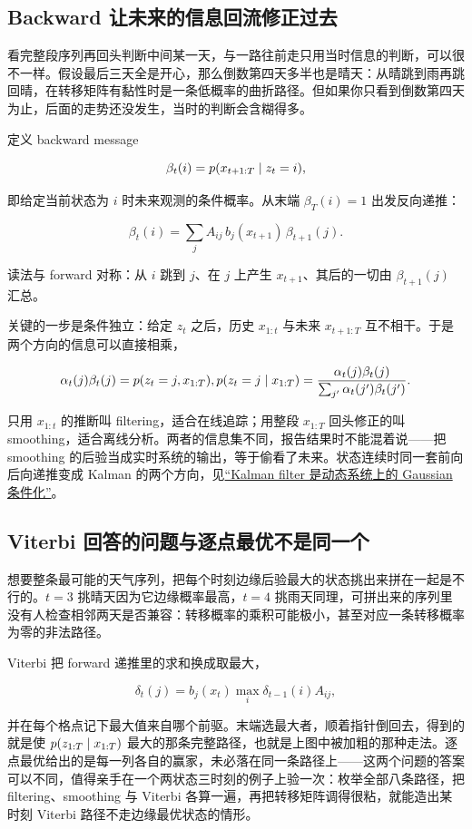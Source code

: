 \subsection{Backward 让未来的信息回流修正过去}

看完整段序列再回头判断中间某一天，与一路往前走只用当时信息的判断，可以很不一样。假设最后三天全是开心，那么倒数第四天多半也是晴天：从晴跳到雨再跳回晴，在转移矩阵有黏性时是一条低概率的曲折路径。但如果你只看到倒数第四天为止，后面的走势还没发生，当时的判断会含糊得多。

定义 backward message

\[
\beta_t(i)=p(x_{t+1:T}\mid z_t=i),
\]

即给定当前状态为 \(i\) 时未来观测的条件概率。从末端 \(\beta_T(i)=1\) 出发反向递推：

\[
\beta_t(i)=\sum_jA_{ij}\,b_j(x_{t+1})\,\beta_{t+1}(j).
\]

读法与 forward 对称：从 \(i\) 跳到 \(j\)、在 \(j\) 上产生 \(x_{t+1}\)、其后的一切由 \(\beta_{t+1}(j)\) 汇总。

关键的一步是条件独立：给定 \(z_t\) 之后，历史 \(x_{1:t}\) 与未来 \(x_{t+1:T}\) 互不相干。于是两个方向的信息可以直接相乘，

\[
\alpha_t(j)\beta_t(j)=p(z_t=j,x_{1:T}),
\space
p(z_t=j\mid x_{1:T})=\frac{\alpha_t(j)\beta_t(j)}{\sum_{j'}\alpha_t(j')\beta_t(j')}.
\]

只用 \(x_{1:t}\) 的推断叫 filtering，适合在线追踪；用整段 \(x_{1:T}\) 回头修正的叫 smoothing，适合离线分析。两者的信息集不同，报告结果时不能混着说——把 smoothing 的后验当成实时系统的输出，等于偷看了未来。状态连续时同一套前向后向递推变成 Kalman 的两个方向，见\hyperref[sec:13-Machine-Learning/07-Graphical-and-Sequential-Models/03]{``Kalman filter 是动态系统上的 Gaussian 条件化''}。

\subsection{Viterbi 回答的问题与逐点最优不是同一个}

想要整条最可能的天气序列，把每个时刻边缘后验最大的状态挑出来拼在一起是不行的。\(t=3\) 挑晴天因为它边缘概率最高，\(t=4\) 挑雨天同理，可拼出来的序列里没有人检查相邻两天是否兼容：转移概率的乘积可能极小，甚至对应一条转移概率为零的非法路径。

Viterbi 把 forward 递推里的求和换成取最大，

\[
\delta_t(j)=b_j(x_t)\max_i\delta_{t-1}(i)A_{ij},
\]

并在每个格点记下最大值来自哪个前驱。末端选最大者，顺着指针倒回去，得到的就是使 \(p(z_{1:T}\mid x_{1:T})\) 最大的那条完整路径，也就是上图中被加粗的那种走法。逐点最优给出的是每一列各自的赢家，未必落在同一条路径上——这两个问题的答案可以不同，值得亲手在一个两状态三时刻的例子上验一次：枚举全部八条路径，把 filtering、smoothing 与 Viterbi 各算一遍，再把转移矩阵调得很粘，就能造出某时刻 Viterbi 路径不走边缘最优状态的情形。

